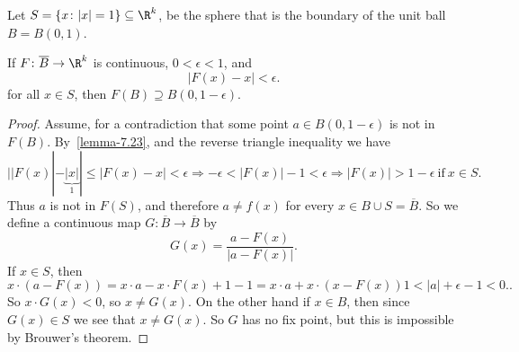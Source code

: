 \begin{lemma}
    Let $S=\{x\colon |x|=1\}\subseteq \R^k$, be the sphere that is the boundary of the unit ball $B = B(0,1)$. 

    If  $F\colon \overline{B}\rightarrow \R^k$ is continuous, $0<\epsilon<1$, and \begin{equation}\label{lemma-7.23}
    |F(x)-x|<\epsilon.
\end{equation}
for all $x\in S$, then $F(B)\supseteq B(0,1-\epsilon)$.

\begin{proof}
    Assume, for a contradiction that some point $a\in B(0,1-\epsilon)$ is not in $F(B)$. By~\ref{lemma-7.23}, and the reverse triangle inequality we have \[
    ||F(x)| - \underbrace{|x|}_{1}| \leq |F(x)-x| < \epsilon \Rightarrow -\epsilon < |F(x)| - 1 < \epsilon \Rightarrow |F(x)|>1-\epsilon \ \text{if} \ x\in S.\]
    Thus $a$ is not in $F(S)$, and therefore $a\neq f(x)$ for every $x\in B\cup S = \overline{B}$. So we define a continuous map $G\colon \overline{B}\rightarrow \overline{B}$ by \[
        G(x) = \frac{a-F(x)}{|a-F(x)|}
    .\]
    If $x\in S$, then \[
        x\cdot (a-F(x)) = x\cdot a -x\cdot F(x) + 1 - 1 = x\cdot a +x\cdot (x-F(x))  1 < |a| +\epsilon - 1< 0.
    .\]
    So $x\cdot G(x)<0$, so $x\neq G(x)$. On the other hand if $x\in B$, then since $G(x)\in S$ we see that $x\neq G(x)$. So $G$ has no fix point, but this is impossible by Brouwer's theorem. 
\end{proof}

\end{lemma}



\printindex

